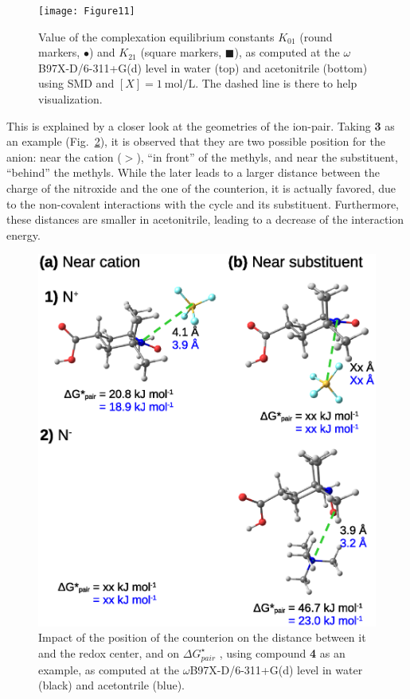 \documentclass[review]{elsarticle}
\begin{document}
\begin{figure}[!h]
\centering
\texttt{[image: Figure11]}
\caption{Value of the complexation equilibrium constants $K_{01}$ (round markers, $\bullet$) and $K_{21}$ (square markers, $\blacksquare$), as computed at the $\omega$B97X-D/6-311+G(d) level in water (top) and acetonitrile (bottom) using SMD and $[X]=\SI{1}{\mole\per\liter}$.  The dashed line is there to help visualization. }
\label{fig:Kx1}
\end{figure}

This is explained by a closer look at the geometries of the ion-pair. Taking \textbf{3} as an example (Fig.~\ref{fig:pos-anion}), it is observed that they are two possible position for the anion: near the cation ($>$), ``in front'' of the methyls, and near the substituent, ``behind'' the methyls. While the later leads to a larger distance between the charge of the nitroxide and the one of the counterion, it is actually favored, due to the non-covalent interactions with the cycle and its substituent.  Furthermore, these distances are smaller in acetonitrile, leading to a decrease of the interaction energy.
\begin{figure}[!h]
	\centering
	\includegraphics[width=.7\linewidth]{Figure12}
	\caption{Impact of the position of the counterion on the distance between it and the redox center, and on $\Delta G^\star_{pair}$ , using compound \textbf{4} as an example, as computed at the $\omega$B97X-D/6-311+G(d) level in water (black) and acetontrile (blue).  }
	\label{fig:pos-anion}
\end{figure}
\end{document}
